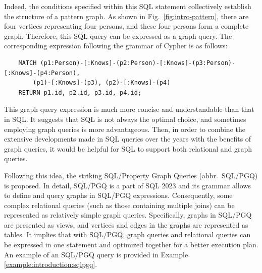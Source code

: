 Indeed, the conditions specified within this SQL statement collectively establish the structure of a pattern graph.
As shown in Fig.~\ref{fig:intro-pattern}, there are four vertices representing four persons, and these four persons form a complete graph.
Therefore, this SQL query can be expressed as a graph query.
The corresponding expression following the grammar of Cypher \cite{opencypher} is as follows: 
\begin{lstlisting}
    MATCH (p1:Person)-[:Knows]-(p2:Person)-[:Knows]-(p3:Person)-[:Knows]-(p4:Person),
        (p1)-[:Knows]-(p3), (p2)-[:Knows]-(p4)
    RETURN p1.id, p2.id, p3.id, p4.id;
\end{lstlisting} 
This graph query expression is much more concise and understandable than that in SQL.
It suggests that SQL is not always the optimal choice, and sometimes employing graph queries is more advantageous.
Then, in order to combine the extensive developments made in SQL queries over the years with the benefits of graph queries, it would be helpful for SQL to support both relational and graph queries.

Following this idea, the striking SQL/Property Graph Queries (abbr.~SQL/PGQ) is proposed.
In detail, SQL/PGQ is a part of SQL 2023 and its grammar allows to define and query graphs in SQL/PGQ expressions.
Consequently, some complex relational queries (such as those containing multiple joins) can be represented as relatively simple graph queries.
Specifically, graphs in SQL/PGQ are presented as views, and vertices and edges in the graphs are represented as tables.
It implies that with SQL/PGQ, graph queries and relational queries can be expressed in one statement and optimized together for a better execution plan.
An example of an SQL/PGQ query is provided in Example \ref{example:introduction:sqlpgq}.

